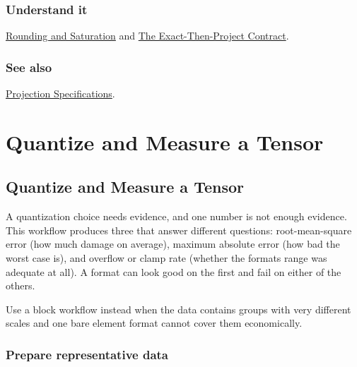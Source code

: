 \subsection{Understand it}



\label{5457362271576251363}{}


\href{concept\_\allowbreak{}rounding\_\allowbreak{}saturation.md}{Rounding and Saturation} and \href{concept\_\allowbreak{}exact\_\allowbreak{}then\_\allowbreak{}project.md}{The Exact-Then-Project Contract}.



\subsection{See also}



\label{292862844209942199-dup8}{}


\href{reference\_\allowbreak{}projections.md}{Projection Specifications}.



\chapter{Quantize and Measure a Tensor}


\section{Quantize and Measure a Tensor}



\label{15447394009463313173}{}


A quantization choice needs evidence, and one number is not enough evidence. This workflow produces three that answer different questions: root-mean-square error (how much damage on average), maximum absolute error (how bad the worst case is), and overflow or clamp rate (whether the format{\textquotesingle}s range was adequate at all). A format can look good on the first and fail on either of the others.



Use a block workflow instead when the data contains groups with very different scales and one bare element format cannot cover them economically.



\subsection{Prepare representative data}



